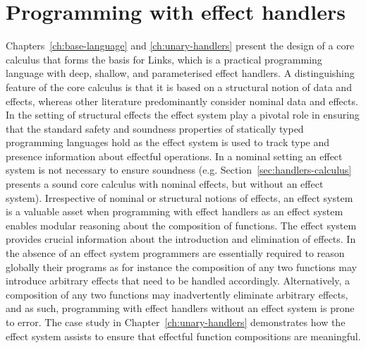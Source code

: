 \documentclass[12pt,phd,lfcs,twoside,openright,logo,leftchapter,normalheadings]{infthesis}
\theoremstyle{plain}
\theoremstyle{definition}
\begin{document}
\section{Programming with effect handlers}
Chapters~\ref{ch:base-language} and \ref{ch:unary-handlers} present
the design of a core calculus that forms the basis for Links, which is
a practical programming language with deep, shallow, and parameterised
effect handlers. A distinguishing feature of the core calculus is that
it is based on a structural notion of data and effects, whereas other
literature predominantly consider nominal data and effects. In the
setting of structural effects the effect system play a pivotal role in
ensuring that the standard safety and soundness properties of
statically typed programming languages hold as the effect system is
used to track type and presence information about effectful
operations. In a nominal setting an effect system is not necessary to
ensure soundness (e.g. Section~\ref{sec:handlers-calculus} presents a
sound core calculus with nominal effects, but without an effect
system). Irrespective of nominal or structural notions of effects, an
effect system is a valuable asset when programming with effect
handlers as an effect system enables modular reasoning about the
composition of functions. The effect system provides crucial
information about the introduction and elimination of effects. In the
absence of an effect system programmers are essentially required to
reason globally their programs as for instance the composition of any
two functions may introduce arbitrary effects that need to be handled
accordingly. Alternatively, a composition of any two functions may
inadvertently eliminate arbitrary effects, and as such, programming
with effect handlers without an effect system is prone to error. The
\UNIX{} case study in Chapter~\ref{ch:unary-handlers} demonstrates how
the effect system assists to ensure that effectful function
compositions are meaningful.
\end{document}
